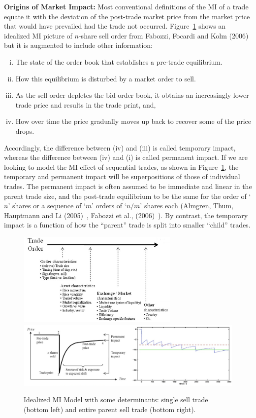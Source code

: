 \noindent \textbf{Origins of Market Impact:} \label{in:permimp} Most conventional definitions of the MI of a trade equate it with the deviation of the post-trade market price from the market price that would have prevailed had the trade not occurred. Figure~\ref{fig:marketimpt} shows an idealized MI picture of $n$-share sell order from Fabozzi, Focardi and Kolm (2006)~\cite{ffk} but it is augmented to include other information:
	\begin{enumerate}[(i)]
	\item The state of the order book that establishes a pre-trade equilibrium.
	\item How this equilibrium is disturbed by a market order to sell.
	\item As the sell order depletes the bid order book, it obtains an increasingly lower trade price and results in the trade print, and, 
	\item How over time the price gradually moves up back to recover some of the price drops.
	\end{enumerate}
Accordingly, the difference between (iv) and (iii) is called temporary impact, whereas the difference between (iv) and (i) is called permanent impact. If we are looking to model the MI effect of sequential trades, as shown in Figure~\ref{fig:marketimpt}, the temporary and permanent impact will be superpositions of those of individual trades. The permanent impact is often assumed to be immediate and linear in the parent trade size, and the post-trade equilibrium to be the same for the order of `$n$' shares or a sequence of `$m$' orders of `$n/m$' shares each (Almgren, Thum, Hauptmann and Li (2005)~\cite{athl}, Fabozzi et al., (2006)~\cite{ffk}). By contrast, the temporary impact is a function of how the ``parent'' trade is split into smaller ``child'' trades.\label{in:tempimpact}

	\begin{figure}[!ht]
	\centering
	\includegraphics[width=0.7\textwidth]{chapters/chapter_mi_models/figures/fig2b.png}
	\includegraphics[width=\textwidth]{chapters/chapter_mi_models/figures/fig1ab2.png}
	\caption{Idealized MI Model with some determinants: single sell trade (bottom left) and entire parent sell trade (bottom right). \label{fig:marketimpt}}
	\end{figure}


